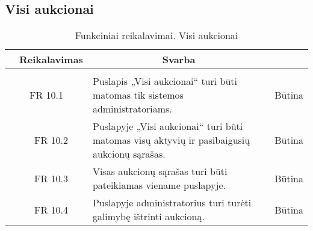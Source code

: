 \documentclass{VUMIFPSkursinis}
\begin{document}
\subsection{Visi aukcionai}
\begin{table}[H]
	\caption{Funkciniai reikalavimai. Visi aukcionai}
	\begin{tabular}{|p{1cm}|p{1cm}|p{}|p{}|}
		\hline 
		\rowcolor{gray!50}
		\multicolumn{2}{|c|}{{\bfseries Kodas}}&
		\multicolumn{1}{c|}{{\bfseries Reikalavimas}}&
		\multicolumn{1}{c|}{{\bfseries Svarba}}\\
		\hline
		\rowcolor{lightgray}
		\multicolumn{4}{|c|}{Visi aukcionai}\\				
		\hline
		\multicolumn{2}{|c|}{FR 10.1}&
		{Puslapis „Visi aukcionai“ turi būti matomas tik sistemos administratoriams.
		}&		
		\multicolumn{1}{c|}{Būtina}\\
		\hline
		\multicolumn{1}{|c}{}&
		\multicolumn{1}{c|}{FR 10.2}&
		{Puslapyje „Visi aukcionai“ turi būti matomas visų aktyvių ir pasibaigusių aukcionų sąrašas.
		}&		
		\multicolumn{1}{c|}{Būtina}\\
		\hline	
		\multicolumn{1}{|c}{}&
		\multicolumn{1}{c|}{FR 10.3}&
		{Visas aukcionų sąrašas turi būti pateikiamas viename puslapyje.
		}&
		\multicolumn{1}{c|}{Būtina}\\									
		\hline
		\multicolumn{1}{|c}{}&
		\multicolumn{1}{c|}{FR 10.4}&
		{Puslapyje administratorius turi turėti galimybę ištrinti aukcioną.
		}&
		\multicolumn{1}{c|}{Būtina}\\									
		\hline
	\end{tabular}		
\end{table}
\end{document}

